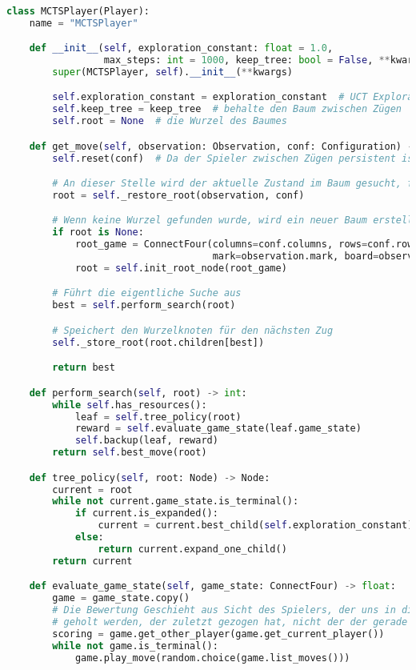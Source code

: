 \begin{lstlisting}[language=Python,caption=Die MCTSPlayer Klasse,label={lst:mcts-player}]

class MCTSPlayer(Player):
    name = "MCTSPlayer"

    def __init__(self, exploration_constant: float = 1.0,
                 max_steps: int = 1000, keep_tree: bool = False, **kwargs):
        super(MCTSPlayer, self).__init__(**kwargs)

        self.exploration_constant = exploration_constant  # UCT Exploration Konstante Cp
        self.keep_tree = keep_tree  # behalte den Baum zwischen Zügen
        self.root = None  # die Wurzel des Baumes

    def get_move(self, observation: Observation, conf: Configuration) -> int:
        self.reset(conf)  # Da der Spieler zwischen Zügen persistent ist, können hier Variablen pro Zug zurückgesetzt werden

        # An dieser Stelle wird der aktuelle Zustand im Baum gesucht, falls der Baum zwischen Zügen erhalten bleibt
        root = self._restore_root(observation, conf)

        # Wenn keine Wurzel gefunden wurde, wird ein neuer Baum erstellt
        if root is None:
            root_game = ConnectFour(columns=conf.columns, rows=conf.rows, inarow=conf.inarow,
                                    mark=observation.mark, board=observation.board)
            root = self.init_root_node(root_game)

        # Führt die eigentliche Suche aus
        best = self.perform_search(root)

        # Speichert den Wurzelknoten für den nächsten Zug
        self._store_root(root.children[best])

        return best

    def perform_search(self, root) -> int:
        while self.has_resources():
            leaf = self.tree_policy(root)
            reward = self.evaluate_game_state(leaf.game_state)
            self.backup(leaf, reward)
        return self.best_move(root)

    def tree_policy(self, root: Node) -> Node:
        current = root
        while not current.game_state.is_terminal():
            if current.is_expanded():
                current = current.best_child(self.exploration_constant)
            else:
                return current.expand_one_child()
        return current

    def evaluate_game_state(self, game_state: ConnectFour) -> float:
        game = game_state.copy()
        # Die Bewertung Geschieht aus Sicht des Spielers, der uns in diesen Zustand geführt hat, darum muss der Spieler
        # geholt werden, der zuletzt gezogen hat, nicht der der gerade an der Reihe ist.
        scoring = game.get_other_player(game.get_current_player())
        while not game.is_terminal():
            game.play_move(random.choice(game.list_moves()))


\end{lstlisting}
